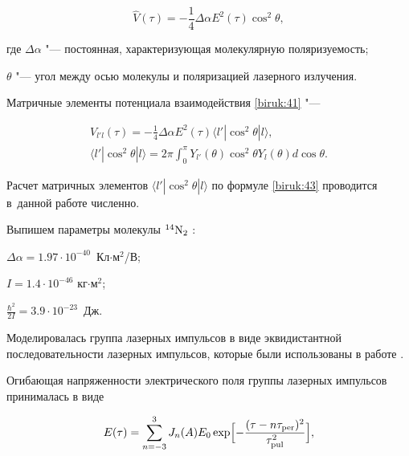 \begin{equation}

\hat{V}(\tau)=-\frac{1}{4}\Delta\alpha E^2(\tau) \cos^2\theta,

\label{biruk:41}

\end{equation}

где $\Delta \alpha$ "--- постоянная, характеризующая молекулярную поляризуемость; 

$\theta$ "--- угол между осью молекулы и поляризацией лазерного излучения.

Матричные элементы потенциала взаимодействия \eqref{biruk:41} "---

\begin{gather}

\label{biruk:42}

V_{l'l}(\tau)=-\frac{1}{4}\Delta\alpha E^2(\tau)\langle l'|\cos^2\theta |l \rangle,

\\

\label{biruk:43}

\langle l'| \cos^2\theta |l\rangle = 2\pi\int _{0}^{\pi} Y_{l'}(\theta) \cos^2\theta Y_l(\theta) d\cos\theta.

\end{gather}

Расчет матричных элементов $\langle l'| \cos^2\theta |l\rangle$ по формуле \eqref{biruk:43} проводится в~данной работе численно.



Выпишем параметры молекулы $^{14}\rm N_2$ \cite{biruk:Irikura_06, biruk:NIST_13}: 

$\Delta\alpha = 1.97\cdot 10^{-40}$~Кл$\cdot$м$^2$/В;

$I = 1.4\cdot 10^{-46}$ кг$\cdot$м$^2$;

$\frac{\hbar^2}{2I}= 3.9\cdot 10^{-23}$~Дж. 



Моделировалась группа лазерных импульсов в виде эквидистантной последовательности лазерных импульсов, которые были использованы в работе \cite{biruk:Zhdanovich_12}. 

Огибающая напряженности электрического поля группы лазерных импульсов принималась в виде

\begin{equation}

E(\tau)=\sum\limits_{n=-3}^{3} J_{n}(A) E_{0}\exp\Bigl[-\frac{(\tau-n\tau_{\rm per})^2}{\tau_{\rm pul}^2}\Bigr],

\label{biruk:44}

\end{equation}

